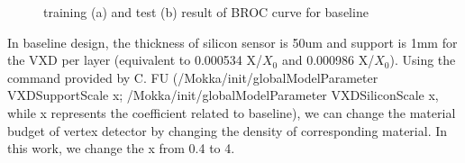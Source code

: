 \documentclass[usetikz]{style/cepcnote}
\begin{document}
\begin{figure}[!ht]
	\centering
	\caption{training (a) and test (b) result of BROC curve for baseline}
	\label{fig:train_test}
\end{figure}


In baseline design, the thickness of silicon sensor is 50um and support is 1mm for the VXD per layer (equivalent to 0.000534 X/$X_0$ and 0.000986 X/$X_0$). Using the command provided by C. FU (/Mokka/init/globalModelParameter VXDSupportScale x; /Mokka/init/globalModelParameter VXDSiliconScale x, while x represents the coefficient related to baseline), we can change the material budget of vertex detector by changing the density of corresponding material. In this work, we change the x from 0.4 to 4. 
\end{document}
